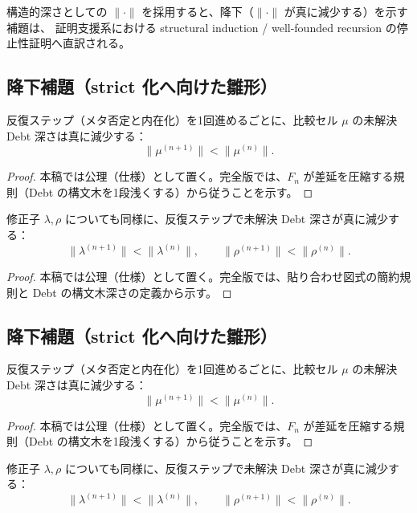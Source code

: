 \documentclass[a4paper,11pt]{article}
\begin{document}
\begin{remark}[構造的深さと構造的帰納法]
構造的深さとしての $\|\cdot\|$ を採用すると、降下（$\|\cdot\|$ が真に減少する）を示す補題は、
証明支援系における structural induction / well-founded recursion の停止性証明へ直訳される。
\end{remark}

\subsection{降下補題（strict 化へ向けた雛形）}
\begin{lemma}[比較セルの深さの降下（雛形）]
反復ステップ（メタ否定と内在化）を1回進めるごとに、比較セル $\mu$ の未解決 Debt 深さは真に減少する：
\[
  \|\mu^{(n+1)}\| < \|\mu^{(n)}\|.
\]
\end{lemma}

\begin{proof}
本稿では公理（仕様）として置く。完全版では、$F_n$ が差延を圧縮する規則（Debt の構文木を1段浅くする）から従うことを示す。
\end{proof}

\begin{lemma}[三角修正子の深さの降下（雛形）]
修正子 $\lambda,\rho$ についても同様に、反復ステップで未解決 Debt 深さが真に減少する：
\[
  \|\lambda^{(n+1)}\| < \|\lambda^{(n)}\|,
  \qquad
  \|\rho^{(n+1)}\| < \|\rho^{(n)}\|.
\]
\end{lemma}

\begin{proof}
本稿では公理（仕様）として置く。完全版では、貼り合わせ図式の簡約規則と Debt の構文木深さの定義から示す。
\end{proof}

\subsection{降下補題（strict 化へ向けた雛形）}
\begin{lemma}[比較セルの深さの降下（雛形）]
反復ステップ（メタ否定と内在化）を1回進めるごとに、比較セル $\mu$ の未解決 Debt 深さは真に減少する：
\[
  \|\mu^{(n+1)}\| < \|\mu^{(n)}\|.
\]
\end{lemma}

\begin{proof}
本稿では公理（仕様）として置く。完全版では、$F_n$ が差延を圧縮する規則（Debt の構文木を1段浅くする）から従うことを示す。
\end{proof}

\begin{lemma}[三角修正子の深さの降下（雛形）]
修正子 $\lambda,\rho$ についても同様に、反復ステップで未解決 Debt 深さが真に減少する：
\[
  \|\lambda^{(n+1)}\| < \|\lambda^{(n)}\|,
  \qquad
  \|\rho^{(n+1)}\| < \|\rho^{(n)}\|.
\]
\end{lemma}
\end{document}
